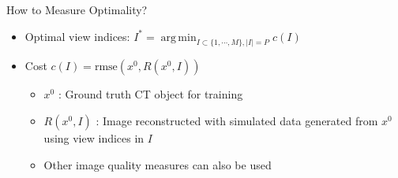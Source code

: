 \documentclass[english,aspectratio=43]{beamer}
\DeclareMathOperator*{\argmin}{arg\,min}
\begin{document}
\begin{frame}{How to Measure Optimality?}
	\begin{itemize}
	    \setlength\itemsep{2em}
		\item Optimal view indices: $I^* = \argmin_{I \subset \{ 1, \cdots, M \}, |I|=P} c(I)  $
		
		\item Cost $c(I) = \text{rmse}(x^0, R(x^0,I))$ 
		\begin{itemize}
		    \item $x^0$ : Ground truth CT object for training
		    \item $R(x^0,I)$ : Image reconstructed with simulated data generated from $x^0$ using view indices in $I$
		    \item Other image quality measures can also be used
		
	    \end{itemize}
		
		
	\end{itemize}
\end{frame}
\end{document}
